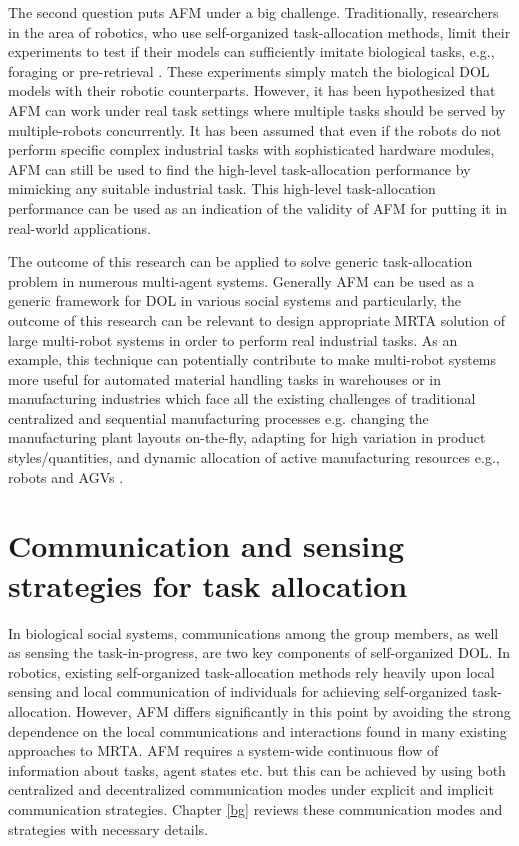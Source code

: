 The second question puts AFM under a big challenge. Traditionally, researchers in the area of robotics, who use self-organized task-allocation methods, limit their experiments to test if their models can sufficiently imitate biological tasks, e.g., foraging \cite{Krieger+2000} or pre-retrieval \cite{Labella2007}. These experiments simply match the biological DOL models with their robotic counterparts. However, it has been hypothesized that AFM can work under real task settings where multiple tasks should be served by multiple-robots concurrently. It has been assumed that even if the robots do not perform specific complex industrial tasks with sophisticated hardware modules, AFM can still be used to find the high-level task-allocation performance by mimicking any suitable industrial task. This high-level task-allocation performance can be used as an indication of the validity of AFM for putting it in real-world applications.

The outcome of this research can be applied to solve generic task-allocation problem in numerous multi-agent systems. Generally AFM can be used as a generic framework for DOL in various social systems and particularly,  the outcome of this research can be relevant to design appropriate MRTA solution of large multi-robot systems in order to perform real industrial tasks. As an example, this technique can potentially contribute to make multi-robot systems more useful for automated material handling tasks in warehouses or in manufacturing industries which face all the existing challenges of traditional centralized and sequential manufacturing processes e.g. changing the manufacturing plant layouts on-the-fly, adapting for high variation in product styles/quantities, and dynamic allocation of active manufacturing resources e.g., robots and \acfp{AGV} \cite{Shen+2006}.
\section{Communication and sensing strategies for task allocation}
\label{intro:comm}
In biological social systems, communications among the group members, as well as sensing the task-in-progress, are two key components of self-organized DOL. In robotics, existing self-organized task-allocation methods rely heavily upon local sensing and local communication of individuals for achieving self-organized task-allocation. However, AFM differs significantly in this point by avoiding the strong dependence on the local communications and interactions found in many existing approaches to MRTA. AFM requires a system-wide continuous flow of information about tasks, agent states etc. but this can be achieved by using both centralized and decentralized communication modes under explicit and implicit communication strategies. Chapter \ref{bg} reviews these communication modes and strategies with necessary details.

